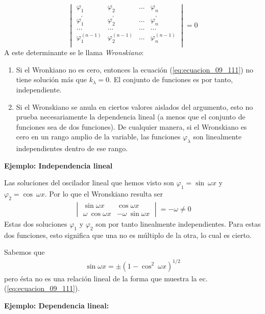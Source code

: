 \begin{equation}
\begin{vmatrix}
\varphi_{1} & \varphi_{2} & \ldots & \varphi_{n} \\[0.5em]
\varphi^{\prime}_{1} & \varphi^{\prime}_{2} & \ldots & \varphi^{\prime}_{n} \\[0.5em]
\ldots & \ldots & \ldots & \ldots \\[0.5em]
\varphi^{(n-1)}_{1} & \varphi^{(n-1)}_{2} & \ldots & \varphi^{(n-1)}_{n} \\
\end{vmatrix} = 0
\label{eq:ecuacion_09_116}
\end{equation}
A este determinante se le llama \emph{Wronskiano}:
\begin{enumerate}
\item Si el Wronkiano no es cero, entonces la ecuación (\ref{eq:ecuacion_09_111}) no tiene solución más que $k_{\lambda}=0$. El conjunto de funciones es por tanto, independiente.
\item Si el Wronskiano se anula en ciertos valores aislados del argumento, esto no prueba necesariamente la dependencia lineal (a menos que el conjunto de funciones sea de dos funciones). De cualquier manera, si el Wronskiano es cero en un rango amplio de la variable, las funciones $\varphi_{\lambda}$ son linealmente independientes dentro de ese rango.
\end{enumerate}
\par
\textbf{Ejemplo: Independencia lineal} 

Las soluciones del oscilador lineal que hemos visto son $\varphi_{1} = \sin \: \omega x$ y $\varphi_{2} = \cos \: \omega x$. Por lo que el Wronskiano resulta ser
\begin{align*}
\begin{vmatrix}
\sin \omega x & \cos \omega x \\
\omega \: \cos \omega x & - \omega \: \sin \omega x
\end{vmatrix} = -\omega \neq 0
\end{align*}
Estas dos soluciones $\varphi_{1}$ y $\varphi_{2}$ son por tanto linealmente independientes. Para estas dos funciones, esto significa que una no es múltiplo de la otra, lo cual es cierto.
\par
Sabemos que
\begin{align*}
\sin \omega x = \pm (1 - \cos^{2} \: \omega x)^{1/2}
\end{align*}
pero ésta no es una relación lineal de la forma que muestra la ec. (\ref{eq:ecuacion_09_111}).
\par
\textbf{Ejemplo: Dependencia lineal:}

